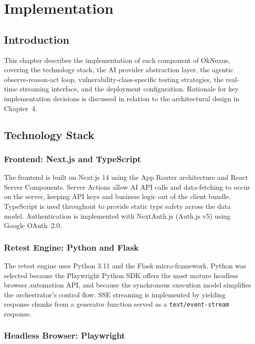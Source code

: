 \chapter{Implementation}

\section{Introduction}

This chapter describes the implementation of each component of OkNexus, covering the technology stack, the AI provider abstraction layer, the agentic observe-reason-act loop, vulnerability-class-specific testing strategies, the real-time streaming interface, and the deployment configuration. Rationale for key implementation decisions is discussed in relation to the architectural design in Chapter~4.

\section{Technology Stack}

\subsection{Frontend: Next.js and TypeScript}

The frontend is built on Next.js 14 using the App Router architecture and React Server Components. Server Actions allow AI API calls and data-fetching to occur on the server, keeping API keys and business logic out of the client bundle. TypeScript is used throughout to provide static type safety across the data model. Authentication is implemented with NextAuth.js (Auth.js v5) using Google OAuth~2.0.

\subsection{Retest Engine: Python and Flask}

The retest engine uses Python 3.11 and the Flask micro-framework. Python was selected because the Playwright Python SDK offers the most mature headless browser automation API, and because the synchronous execution model simplifies the orchestrator's control flow. SSE streaming is implemented by yielding response chunks from a generator function served as a \texttt{text/event-stream} response.

\subsection{Headless Browser: Playwright}

